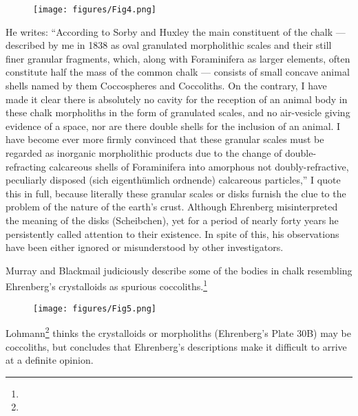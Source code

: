 \documentclass[a4paper, 12pt, oneside]{article}
\begin{document}
\begin{figure}[H]
\centering
\texttt{[image: figures/Fig4.png]}
\caption*{}
\end{figure}
He writes: ``According to Sorby and Huxley the main constituent of the chalk --- described by me in 1838 as oval granulated morpholithic scales and their still finer granular fragments, which, along with Foraminifera as larger elements, often constitute half the mass of the common chalk --- consists of small concave animal shells named by them Coccospheres and Coccoliths. On the contrary, I have made it clear there is absolutely no cavity for the reception of an animal body in these chalk morpholiths in the form of granulated scales, and no air-vesicle giving evidence of a space, nor are there double shells for the inclusion of an animal. I have become ever more firmly convinced that these granular scales must be regarded as inorganic morpholithic products due to the change of double-refracting calcareous shells of Foraminifera into amorphous not doubly-refractive, peculiarly disposed (sich eigenthümlich ordnende) calcareous particles,'' I quote this in full, because literally these granular scales or disks furnish the clue to the problem of the nature of the earth's crust. Although Ehrenberg misinterpreted the meaning of the disks (Scheibchen), yet for a period of nearly forty years he persistently called attention to their existence. In spite of this, his observations have been either ignored or misunderstood by other investigators.

Murray and Blackmail judiciously describe some of the bodies in chalk resembling Ehrenberg's crystalloids as spurious coccoliths.\footnote{}
\begin{figure}[H]
\centering
\texttt{[image: figures/Fig5.png]}
\caption*{}
\end{figure}
Lohmann\footnote{} thinks the crystalloids or morpholiths (Ehrenberg's Plate 30B) may be coccoliths, but concludes that Ehrenberg's descriptions make it difficult to arrive at a definite opinion.
\end{document}
